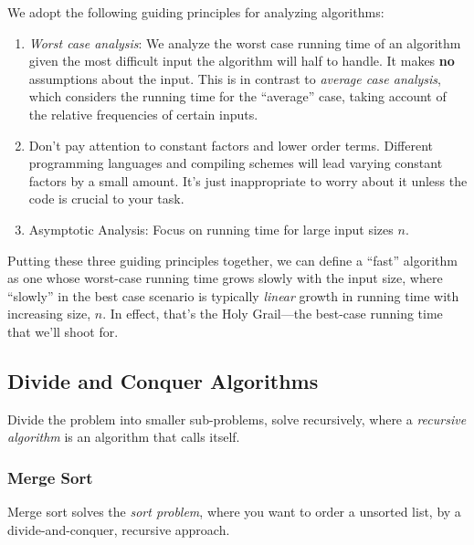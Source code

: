 \documentclass[12pt]{article}
\theoremstyle{plain}
\theoremstyle{definition}
\theoremstyle{remark}
\begin{document}
We adopt the following guiding principles for analyzing
algorithms:
\begin{enumerate}
    \item \emph{Worst case analysis}: We analyze the worst
	case running time of an algorithm given the most
	difficult input the algorithm will half to handle. 
	It makes \textbf{no} assumptions about the input.
	This is in contrast to \emph{average case analysis},
	which considers the running time for the ``average''
	case, taking account of the relative frequencies of 
	certain inputs.
    \item Don't pay attention to constant factors and
	lower order terms. Different programming languages
	and compiling schemes will lead varying constant
	factors by a small amount. It's just inappropriate
	to worry about it unless the code is crucial to
	your task.
    \item Asymptotic Analysis: Focus on running time for 
	large input sizes $n$.
\end{enumerate}
Putting these three guiding principles together, we can
define a ``fast'' algorithm as one whose worst-case 
running time grows slowly with the input size,
where ``slowly'' in the best case scenario is typically
\emph{linear} growth in running time with increasing size, $n$.
In effect, that's the Holy Grail---the best-case running time
that we'll shoot for.


\subsection{Divide and Conquer Algorithms}

Divide the problem into smaller sub-problems, solve recursively,
where a \emph{recursive algorithm} is an algorithm that calls itself.


\subsubsection{Merge Sort}

Merge sort solves the \emph{sort problem}, where you want to 
order a unsorted list, by a divide-and-conquer, recursive
approach.
\end{document}
